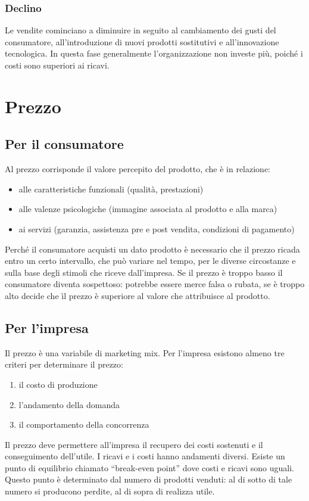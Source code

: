 \subsubsection{Declino}
Le vendite cominciano a diminuire in seguito al cambiamento dei gusti del consumatore, all’introduzione di nuovi prodotti sostitutivi e all’innovazione tecnologica. In questa fase generalmente l’organizzazione non investe più, poiché i costi sono superiori ai ricavi.

\section{Prezzo}
\subsection{Per il consumatore}
Al prezzo corrisponde il valore percepito del prodotto, che è
in relazione:
\begin{itemize}
	\item alle caratteristiche funzionali (qualità, prestazioni)
	\item alle valenze psicologiche (immagine associata al prodotto e alla marca)
	\item ai servizi (garanzia, assistenza pre e post vendita, condizioni di pagamento)
\end{itemize}
Perché il consumatore acquisti un dato prodotto è necessario che il prezzo ricada entro un certo intervallo, che può variare nel tempo, per le diverse circostanze e sulla base degli stimoli che riceve dall’impresa.
Se il prezzo è troppo basso il consumatore diventa sospettoso: potrebbe essere merce falsa o rubata, se è troppo alto decide che ìl prezzo è superiore al valore che attribuisce al prodotto.

\subsection{Per l'impresa}
Il prezzo è una variabile di marketing mix.
Per l’impresa esistono almeno tre criteri per determinare il
prezzo:
\begin{enumerate}
	\item il costo di produzione
	\item l’andamento della domanda
	\item il comportamento della concorrenza
\end{enumerate}
Il prezzo deve permettere all'impresa il recupero dei costi
sostenuti e il conseguimento dell'utile.
I ricavi e i costi hanno andamenti diversi. Esiste un punto di equilibrio chiamato “break-even point” dove costi e ricavi sono uguali. Questo punto è determinato dal numero di prodotti venduti: al di sotto di tale numero si producono perdite, al di sopra di realizza utile.

